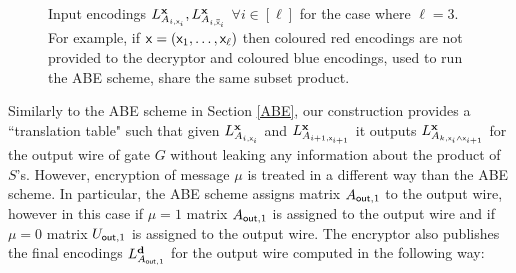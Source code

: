 \begin{figure}[!tbp]
{
    }%
        \label{Linstances}

    \caption{ Input encodings $L_{A_{i, \mathsf{x}_i}}^{\mathsf{{\bf x}}}, L_{A_{i,\overline {\mathsf{x}}_i}}^{\mathsf{{\bf x}}}$ $\forall i\in[\ell]$ for the case where $\ell=3$. For example, if $\mathsf{x}=(\mathsf{x}_1,\ldots,\mathsf{x}_\ell)$ then coloured red encodings are not provided to the decryptor and coloured blue encodings, used to run the ABE scheme, share the same subset product.  }
  \end{figure}    
         
Similarly to the ABE scheme in Section \ref{ABE}, our construction provides a ``translation table" such that given $L_{A_{i,\mathsf{x}_i}}^{\mathsf{{\bf x}}}$ and $L_{A_{i+1,\mathsf{x}_{i+1}}}^{\mathsf{{\bf x}}}$ it outputs $L_{A_{k, \mathsf{x}_i\land \mathsf{x}_{i+1}}}^{\mathsf{{\bf x}}}$ for the output wire of gate $G$ without leaking any information about the product of $S$'s. However, encryption of message $\mu$ is treated in a different way than the ABE scheme. In particular, the ABE scheme assigns matrix $A_{\mathsf{out},1}$ to the output wire, however in this case if $\mu=1$ matrix $A_{\mathsf{out},1}$ is assigned to the output wire and if $\mu=0$ matrix $U_{\mathsf{out},1}$ is assigned to the output wire. The encryptor also publishes the final encodings $L_{A_{\mathsf{out},1}}^{\mathbf d}$ for the output wire computed in the following way: 


